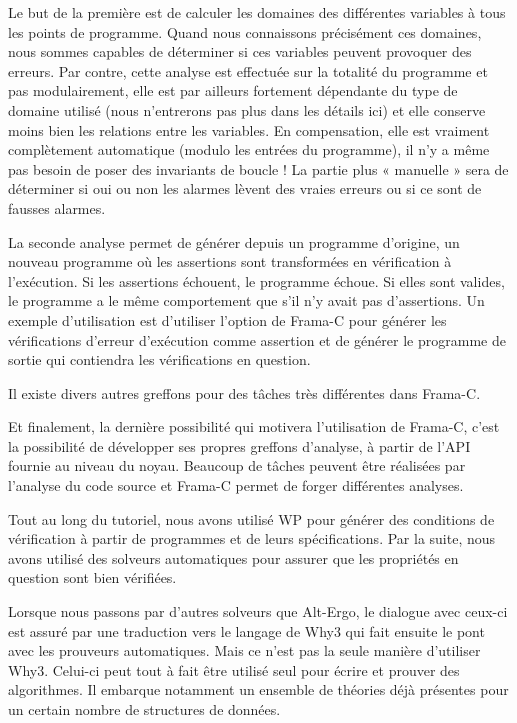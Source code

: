 Le but de la première est de calculer les domaines des différentes variables à
tous les points de programme. Quand nous connaissons précisément ces domaines,
nous sommes capables de déterminer si ces variables peuvent provoquer des erreurs.
Par contre, cette analyse est effectuée sur la totalité du programme et pas
modulairement, elle est par ailleurs fortement dépendante du type de domaine
utilisé (nous n'entrerons pas plus dans les détails ici) et elle conserve moins
bien les relations entre les variables. En compensation, elle est vraiment
complètement automatique (modulo les entrées du programme), il n'y a même pas
besoin de poser des invariants de boucle ! La partie plus « manuelle » sera de
déterminer si oui ou non les alarmes lèvent des vraies erreurs ou si ce sont de
fausses alarmes.



La seconde analyse permet de générer depuis un programme d'origine, un nouveau
programme où les assertions sont transformées en vérification à l'exécution. Si
les assertions échouent, le programme échoue. Si elles sont valides, le programme
a le même comportement que s'il n'y avait pas d'assertions. Un exemple
d'utilisation est d'utiliser l'option  de Frama-C pour générer les
vérifications d'erreur d'exécution comme assertion et de générer le programme de
sortie qui contiendra les vérifications en question.



Il existe divers autres greffons pour des tâches très différentes dans Frama-C.


Et finalement, la dernière possibilité qui motivera l'utilisation de Frama-C,
c'est la possibilité de développer ses propres greffons d'analyse, à partir de
l'API fournie au niveau du noyau. Beaucoup de tâches peuvent être réalisées par
l'analyse du code source et Frama-C permet de forger différentes analyses.





Tout au long du tutoriel, nous avons utilisé WP pour générer des conditions de
vérification à partir de programmes et de leurs spécifications. Par la suite,
nous avons utilisé des solveurs automatiques pour assurer que les propriétés en
question sont bien vérifiées.



Lorsque nous passons par d'autres solveurs que Alt-Ergo, le dialogue avec ceux-ci
est assuré par une traduction vers le langage de Why3 qui fait ensuite le pont
avec les prouveurs automatiques. Mais ce n'est pas la seule manière d'utiliser
Why3. Celui-ci peut tout à fait être utilisé seul pour écrire et prouver des
algorithmes. Il embarque notamment un ensemble de théories déjà présentes pour un
certain nombre de structures de données.



